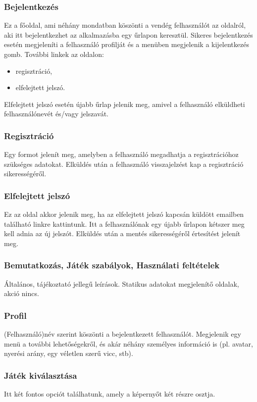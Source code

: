 \subsubsection{Bejelentkezés}
Ez a főoldal, ami néhány mondatban köszönti a vendég felhasználót az oldalról, aki itt bejelentkezhet az alkalmazásba egy űrlapon keresztül.
Sikeres bejelentkezés esetén megjeleníti a felhasználó profilját és a menüben megjelenik a kijelentkezés gomb.
További linkek az oldalon:
\begin{itemize}
	\item regisztráció,
	\item elfelejtett jelszó.
\end{itemize}
Elfelejtett jelszó esetén újabb űrlap jelenik meg, amivel a felhasználó elküldheti felhasználónevét és/vagy jelszavát.


\subsubsection{Regisztráció}
Egy formot jelenít meg, amelyben a felhasználó megadhatja a regisztrációhoz szükséges adatokat. Elküldés után a felhasználó visszajelzést kap a regisztráció sikerességéről.

\subsubsection{Elfelejtett jelszó}
Ez az oldal akkor jelenik meg, ha az elfelejtett jelszó kapcsán küldött emailben található linkre kattintunk. Itt a felhasználónak egy újabb űrlapon kétszer meg kell adnia az új jelszót. Elküldés után a mentés sikerességéről értesítést jelenít meg.

\subsubsection{Bemutatkozás, Játék szabályok, Használati feltételek}
Általános, tájékoztató jellegű leírások. Statikus adatokat megjelenítő oldalak, akció nincs.

\subsubsection{Profil}
(Felhasználó)név szerint köszönti a bejelentkezett felhasználót. Megjelenik egy menü a további lehetőségekről, és akár néhány személyes információ is (pl. avatar, nyerési arány, egy véletlen szerű vicc, stb).

\subsubsection{Játék kiválasztása}
Itt két fontos opciót találhatunk, amely a képernyőt két részre osztja.

